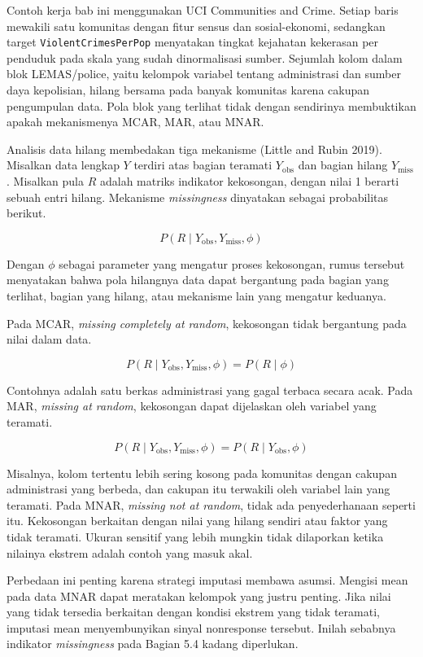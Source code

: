 Contoh kerja bab ini menggunakan UCI Communities and Crime. Setiap baris mewakili satu komunitas dengan fitur sensus dan sosial-ekonomi, sedangkan target \passthrough{\lstinline!ViolentCrimesPerPop!} menyatakan tingkat kejahatan kekerasan per penduduk pada skala yang sudah dinormalisasi sumber. Sejumlah kolom dalam blok LEMAS/police, yaitu kelompok variabel tentang administrasi dan sumber daya kepolisian, hilang bersama pada banyak komunitas karena cakupan pengumpulan data. Pola blok yang terlihat tidak dengan sendirinya membuktikan apakah mekanismenya MCAR, MAR, atau MNAR.

Analisis data hilang membedakan tiga mekanisme (Little and Rubin 2019). Misalkan data lengkap \(Y\) terdiri atas bagian teramati \(Y_{\text{obs}}\) dan bagian hilang \(Y_{\text{miss}}\). Misalkan pula \(R\) adalah matriks indikator kekosongan, dengan nilai 1 berarti sebuah entri hilang. Mekanisme \emph{missingness} dinyatakan sebagai probabilitas berikut.

\[
P(R \mid Y_{\text{obs}}, Y_{\text{miss}}, \phi)
\]

Dengan \(\phi\) sebagai parameter yang mengatur proses kekosongan, rumus tersebut menyatakan bahwa pola hilangnya data dapat bergantung pada bagian yang terlihat, bagian yang hilang, atau mekanisme lain yang mengatur keduanya.

Pada MCAR, \emph{missing completely at random}, kekosongan tidak bergantung pada nilai dalam data.

\[
P(R \mid Y_{\text{obs}}, Y_{\text{miss}}, \phi) = P(R \mid \phi)
\]

Contohnya adalah satu berkas administrasi yang gagal terbaca secara acak. Pada MAR, \emph{missing at random}, kekosongan dapat dijelaskan oleh variabel yang teramati.

\[
P(R \mid Y_{\text{obs}}, Y_{\text{miss}}, \phi) = P(R \mid Y_{\text{obs}}, \phi)
\]

Misalnya, kolom tertentu lebih sering kosong pada komunitas dengan cakupan administrasi yang berbeda, dan cakupan itu terwakili oleh variabel lain yang teramati. Pada MNAR, \emph{missing not at random}, tidak ada penyederhanaan seperti itu. Kekosongan berkaitan dengan nilai yang hilang sendiri atau faktor yang tidak teramati. Ukuran sensitif yang lebih mungkin tidak dilaporkan ketika nilainya ekstrem adalah contoh yang masuk akal.

Perbedaan ini penting karena strategi imputasi membawa asumsi. Mengisi mean pada data MNAR dapat meratakan kelompok yang justru penting. Jika nilai yang tidak tersedia berkaitan dengan kondisi ekstrem yang tidak teramati, imputasi mean menyembunyikan sinyal nonresponse tersebut. Inilah sebabnya indikator \emph{missingness} pada Bagian 5.4 kadang diperlukan.

